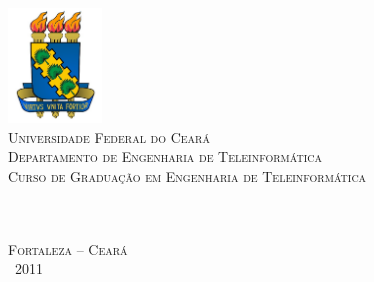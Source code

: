 \thispagestyle{empty}%

\begin{center}
    \includegraphics[width=2.5cm,bb=0 0 382 465]{figs/ufc.jpg} \\%
    \textsc{
    Universidade Federal do Cear\'{a} \\%
    Departamento de Engenharia de Teleinform\'{a}tica \\%
    Curso de Gradua\c{c}\~{a}o em Engenharia de Teleinform\'{a}tica\\
    }
    \vspace{2.5 cm}%
    {       \textbf{\autor}
    }\\%

    \null\vfill%
    \vspace{.2cm}%
    {\Large         \textbf{\titulo}\\}


    \null\vfill%
    \vspace{1 cm}%
    {\normalsize    \textsc{Fortaleza -- Cear\'{a} \\%
                            \monthname~2011 }}
\end{center}
